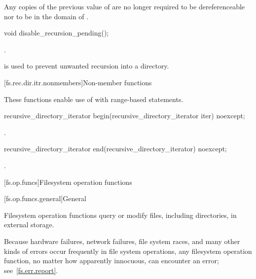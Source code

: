 \pnum
\remarks
Any copies of the previous value of 
are no longer required
to be dereferenceable nor to be in the domain of \tcode{==}.

%
\begin{itemdecl}
void disable_recursion_pending();
\end{itemdecl}

\begin{itemdescr}
\pnum
\ensures
{}.

\pnum
\begin{note}
 is used to prevent
  unwanted recursion into a directory.
\end{note}
\end{itemdescr}

[fs.rec.dir.itr.nonmembers]{Non-member functions}

\pnum
These functions enable use of 
with range-based  statements.

%
\begin{itemdecl}
recursive_directory_iterator begin(recursive_directory_iterator iter) noexcept;
\end{itemdecl}

\begin{itemdescr}
\pnum
\returns
{}.
\end{itemdescr}

%
\begin{itemdecl}
recursive_directory_iterator end(recursive_directory_iterator) noexcept;
\end{itemdecl}

\begin{itemdescr}
\pnum
\returns
{}.
\end{itemdescr}

[fs.op.funcs]{Filesystem operation functions}

[fs.op.funcs.general]{General}

\pnum
Filesystem operation functions query or modify files, including directories,
in external storage.

\pnum
\begin{note}
Because hardware failures, network failures, file system races,
and many other kinds of errors occur frequently in file system operations,
any filesystem operation function, no matter how apparently innocuous,
can encounter an error; see~\ref{fs.err.report}.
\end{note}

